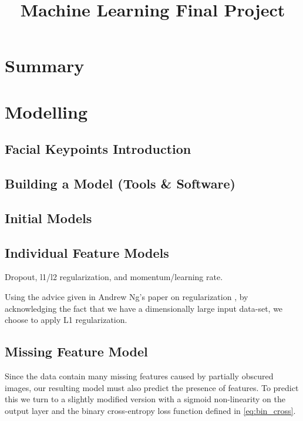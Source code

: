 \documentclass[conference]{IEEEtran}
\begin{document}
\title{Machine Learning Final Project}
\author{
\and
{}
}

\maketitle

\section{Summary}

\section{Modelling}
\subsection{Facial Keypoints Introduction}
\subsection{Building a Model (Tools \& Software)}
\subsection{Initial Models}
\subsection{Individual Feature Models}
Dropout, l1/l2 regularization, and momentum/learning rate.

Using the advice given in Andrew Ng's paper on regularization \cite{ng2004feature}, by acknowledging the fact that we have a dimensionally large input data-set, we choose to apply L1 regularization.

\subsection{Missing Feature Model}
Since the data contain many missing features caused by partially obscured images, our resulting model must also predict the presence of features.  To predict this we turn to a slightly modified version with a sigmoid non-linearity on the output layer and the binary cross-entropy loss function defined in \cref{eq:bin_cross}.
\end{document}

